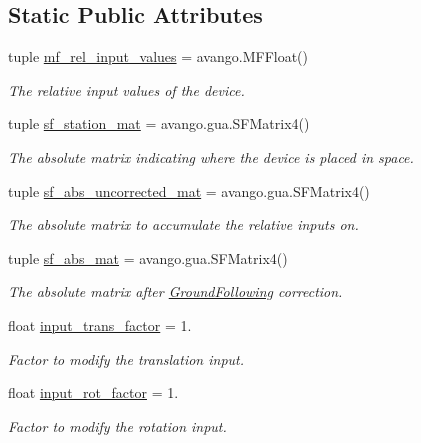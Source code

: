 \subsection*{\-Static \-Public \-Attributes}
\begin{DoxyCompactItemize}
\item 
tuple \hyperlink{classlib_1_1InputMapping_1_1InputMapping_aec01e470e9cd8c524b19b8a01afb4fdb}{mf\-\_\-rel\-\_\-input\-\_\-values} = avango.\-M\-F\-Float()
\begin{DoxyCompactList}\small\item\em \-The relative input values of the device. \end{DoxyCompactList}\item 
tuple \hyperlink{classlib_1_1InputMapping_1_1InputMapping_a1b87d0b4819c4602c57873d4e51ad7d6}{sf\-\_\-station\-\_\-mat} = avango.\-gua.\-S\-F\-Matrix4()
\begin{DoxyCompactList}\small\item\em \-The absolute matrix indicating where the device is placed in space. \end{DoxyCompactList}\item 
tuple \hyperlink{classlib_1_1InputMapping_1_1InputMapping_ac7a4f5655e3bc96a8f797e2b1c0b4a84}{sf\-\_\-abs\-\_\-uncorrected\-\_\-mat} = avango.\-gua.\-S\-F\-Matrix4()
\begin{DoxyCompactList}\small\item\em \-The absolute matrix to accumulate the relative inputs on. \end{DoxyCompactList}\item 
tuple \hyperlink{classlib_1_1InputMapping_1_1InputMapping_a44f8fd2a985a8b7f9c700db4403344d7}{sf\-\_\-abs\-\_\-mat} = avango.\-gua.\-S\-F\-Matrix4()
\begin{DoxyCompactList}\small\item\em \-The absolute matrix after \hyperlink{namespacelib_1_1GroundFollowing}{\-Ground\-Following} correction. \end{DoxyCompactList}\item 
float \hyperlink{classlib_1_1InputMapping_1_1InputMapping_a8fd624b0a9dab37f427ae7ffdd35a88c}{input\-\_\-trans\-\_\-factor} = 1.
\begin{DoxyCompactList}\small\item\em \-Factor to modify the translation input. \end{DoxyCompactList}\item 
float \hyperlink{classlib_1_1InputMapping_1_1InputMapping_ae329d4e40a99472bc0e5fd036c60fdc0}{input\-\_\-rot\-\_\-factor} = 1.
\begin{DoxyCompactList}\small\item\em \-Factor to modify the rotation input. \end{DoxyCompactList}\end{DoxyCompactItemize}


